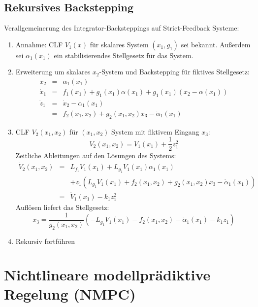 \subsection{Rekursives Backstepping}
Verallgemeinerung des Integrator-Backsteppings auf Strict-Feedback Systeme:
\begin{enumerate}
    \item
        Annahme: CLF $V_1(x)$ für skalares System $(x_1, g_1)$ sei bekannt.
        Außerdem sei $\alpha_1(x_1)$ ein stabilisierendes Stellgesetz für das
        System.
    \item
        Erweiterung um skalares $x_2$-System und Backstepping für fiktives Stellgesetz:
        \begin{eqnarray}
            x_2 &=& \alpha_1(x_1) \\
            \dot{x}_1 &=& f_1(x_1) + g_1(x_1) \alpha(x_1) + g_1(x_1) (x_2 - \alpha(x_1)) \\
            \dot{z}_1 &=& \dot{x}_2 - \dot{\alpha}_1 (x_1) \\
                      &=& f_2(x_1, x_2) + g_2(x_1, x_2)x_3 - \dot{\alpha}_1(x_1)
        \end{eqnarray}
    \item
        CLF $V_2(x_1, x_2)$ für $(x_1, x_2)$ System mit fiktivem Eingang $x_3$:
        \begin{equation}
            V_2(x_1, x_2) = V_1(x_1) + \frac{1}{2} z_1^2
        \end{equation}
        Zeitliche Ableitungen auf den Lösungen des Systems:
        \begin{eqnarray}
            \dot{V}_2(x_1, x_2) &=& L_{f_1} V_1(x_1) + L_{g_1} V_1(x_1) \alpha_1(x_1) \\
                && + z_1 (L_{g_1} V_1(x_1) + f_2(x_1, x_2) + g_2(x_1, x_2) x_3 - \dot{\alpha}_1(x_1)) \\
                &=& \dot{V}_1(x_1) - k_1 z_1^2
        \end{eqnarray}
        Auflösen liefert das Stellgesetz:
        \begin{equation}
            x_3 = \frac{1}{g_2(x_1, x_2)} (-L_{g_1} V_1(x_1) - f_2(x_1, x_2) + \dot{\alpha}_1 (x_1) - k_1 z_1)
        \end{equation} 
    \item Rekursiv fortführen
\end{enumerate}

\section{Nichtlineare modellprädiktive Regelung (NMPC)}
